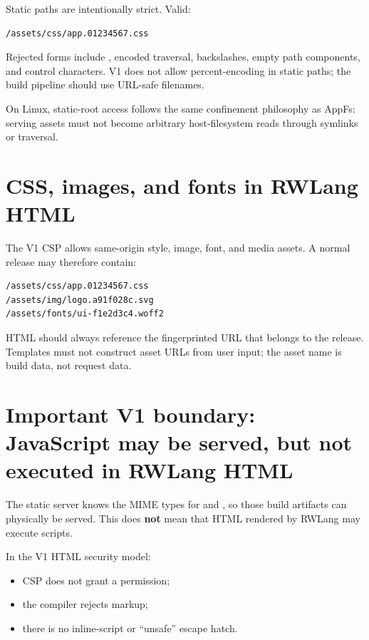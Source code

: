 Static paths are intentionally strict. Valid:

\begin{lstlisting}
/assets/css/app.01234567.css
\end{lstlisting}

Rejected forms include , encoded traversal, backslashes, empty path components, and control characters. V1 does not allow percent-encoding in static paths; the build pipeline should use URL-safe filenames.

On Linux, static-root access follows the same confinement philosophy as AppFs: serving assets must not become arbitrary host-filesystem reads through symlinks or traversal.

\section{CSS, images, and fonts in RWLang HTML}

The V1 CSP allows same-origin style, image, font, and media assets. A normal release may therefore contain:

\begin{lstlisting}
/assets/css/app.01234567.css
/assets/img/logo.a91f028c.svg
/assets/fonts/ui-f1e2d3c4.woff2
\end{lstlisting}

HTML should always reference the fingerprinted URL that belongs to the release. Templates must not construct asset URLs from user input; the asset name is build data, not request data.

\section{Important V1 boundary: JavaScript may be served, but not executed in RWLang HTML}

The static server knows the MIME types for  and , so those build artifacts can physically be served. This does \textbf{not} mean that HTML rendered by RWLang may execute scripts.

In the V1 HTML security model:

\begin{itemize}
  \item CSP does not grant a  permission;
  \item the compiler rejects  markup;
  \item there is no inline-script or ``unsafe'' escape hatch.
\end{itemize}

